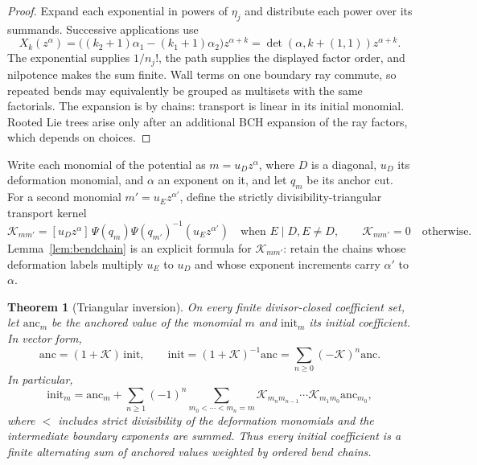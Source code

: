 \documentclass[11pt]{amsart}
\newtheorem{theorem}{Theorem}[section]
\theoremstyle{definition}
\theoremstyle{remark}
\begin{document}
\begin{proof}
Expand each exponential in powers of $\eta_j$ and distribute each power over
its summands.  Successive applications use
\[
 X_k(z^\alpha)=\bigl((k_2+1)\alpha_1-(k_1+1)\alpha_2\bigr)z^{\alpha+k}
 =\det(\alpha,k+(1,1))z^{\alpha+k}.
\]
The exponential supplies $1/n_j!$, the path supplies the displayed factor
order, and nilpotence makes the sum finite.  Wall terms on one boundary ray
commute, so repeated bends may equivalently be grouped as multisets with the
same factorials.  The expansion is by chains: transport is linear
in its initial monomial.  Rooted Lie trees arise only after an additional
BCH expansion of the ray factors, which depends on choices.  \qedhere
\end{proof}

Write each monomial of the potential as $m=u_Dz^\alpha$, where $D$ is a
diagonal, $u_D$ its deformation monomial, and $\alpha$ an exponent on it, and
let $q_m$ be its anchor cut.  For a second monomial $m'=u_Ez^{\alpha'}$, define
the strictly divisibility-triangular transport kernel
\begin{equation}
\label{eq:transportkernel}
 \mathcal K_{mm'}=
 [u_Dz^\alpha]\,\Psi(q_m)\Psi(q_{m'})^{-1}(u_Ez^{\alpha'})
 \quad\text{when }E\mid D, E\ne D,
 \qquad \mathcal K_{mm'}=0\quad\text{otherwise}.
\end{equation}
Lemma~\ref{lem:bendchain} is an explicit formula for $\mathcal K_{mm'}$: retain the
chains whose deformation labels multiply $u_E$ to $u_D$ and whose exponent
increments carry $\alpha'$ to $\alpha$.

\begin{theorem}[Triangular inversion]
\label{thm:seedinversion}
On every finite divisor-closed coefficient set, let $\mathrm{anc}_m$ be the
anchored value of the monomial $m$ and $\mathrm{init}_m$ its initial
coefficient.  In vector form,
\begin{equation}
\label{eq:seedmatrix}
 \mathrm{anc}=(1+\mathcal K)\,\mathrm{init},\qquad
 \mathrm{init}=(1+\mathcal K)^{-1}\mathrm{anc}=\sum_{n\ge0}(-\mathcal K)^n\mathrm{anc}.
\end{equation}
In particular,
\begin{equation}
\label{eq:seedchain}
 \mathrm{init}_m=\mathrm{anc}_m+
 \sum_{n\ge1}(-1)^n
 \sum_{m_0<\cdots<m_n=m}
 \mathcal K_{m_nm_{n-1}}\cdots \mathcal K_{m_1m_0}\mathrm{anc}_{m_0},
\end{equation}
where $<$ includes strict divisibility of the deformation monomials and the
intermediate boundary exponents are summed.  Thus every initial coefficient is
a finite alternating sum of anchored values weighted by ordered
bend chains.
\end{theorem}
\end{document}
